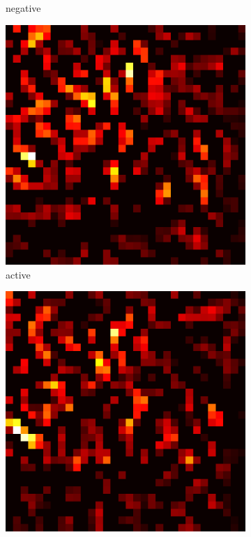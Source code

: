 \documentclass[preprint,12pt]{elsarticle}
\begin{document}
\begin{figure}
\begin{subfigure}{0.14\textwidth}
        \caption{negative}
    \end{subfigure}
    \hfill
    \begin{subfigure}{0.14\textwidth}
        \centering
        \includegraphics[width=\linewidth]{../visualizations/examples/cifar10/resnet18/active_saliency_map/7.png}
        \caption{active}
    \end{subfigure}
    \hfill
    \begin{subfigure}{0.14\textwidth}
        \centering
        \includegraphics[width=\linewidth]{../visualizations/examples/cifar10/resnet18/inactive_saliency_map/7.png}

\end{subfigure}
\end{figure}
\end{document}
